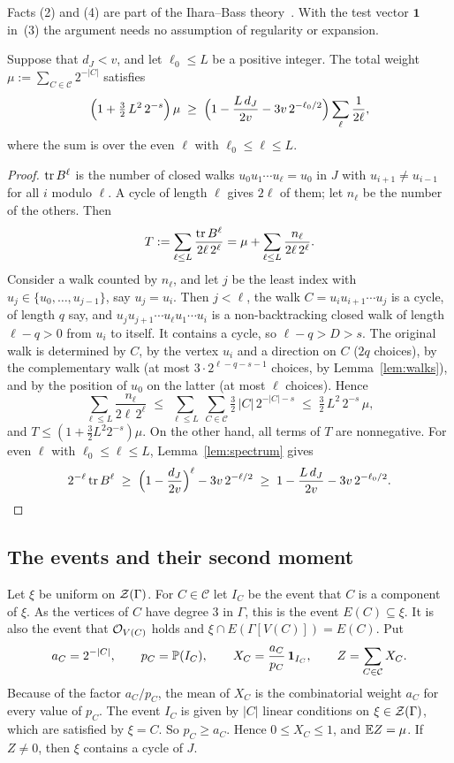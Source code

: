 \documentclass[11pt]{article}
\begin{document}
Facts (2) and (4) are part of the Ihara--Bass theory~\cite{Bass,KS}. With the test vector
$\mathbf{1}$ in~(3) the argument needs no assumption of regularity or expansion.

\begin{lemma}\label{lem:weight}
Suppose that $d_J<v$, and let $\ell_0\le L$ be a positive integer. The total weight
$\mu:=\sum_{C\in\mathcal{C}}2^{-|C|}$ satisfies
\[
  \Bigl(1+\tfrac32\,L^{2}\,2^{-s}\Bigr)\,\mu\;\ge\;
  \Bigl(1-\frac{L\,d_J}{2v}-3v\,2^{-\ell_0/2}\Bigr)\sum_{\ell}\frac1{2\ell},
\]
where the sum is over the even $\ell$ with $\ell_0\le\ell\le L$.
\end{lemma}

\begin{proof}
$\operatorname{tr} B^{\ell}$ is the number of closed walks $u_0u_1\cdots u_\ell=u_0$ in $J$ with
$u_{i+1}\ne u_{i-1}$ for all $i$ modulo $\ell$. A cycle of length $\ell$ gives $2\ell$ of them; let
$n_\ell$ be the number of the others. Then
\[
  T:=\sum_{\ell\le L}\frac{\operatorname{tr} B^{\ell}}{2\ell\,2^{\ell}}=\mu+\sum_{\ell\le L}\frac{n_\ell}{2\ell\,2^{\ell}} .
\]
Consider a walk counted by $n_\ell$, and let $j$ be the least index with
$u_j\in\{u_0,\dots,u_{j-1}\}$, say $u_j=u_i$. Then $j<\ell$, the walk $C=u_iu_{i+1}\cdots u_j$ is a
cycle, of length $q$ say, and $u_ju_{j+1}\cdots u_\ell u_1\cdots u_i$ is a non-backtracking closed
walk of length $\ell-q>0$ from $u_i$ to itself. It contains a cycle, so $\ell-q>D>s$. The original
walk is determined by $C$, by the vertex $u_i$ and a direction on $C$ ($2q$ choices), by the
complementary walk (at most $3\cdot2^{\ell-q-s-1}$ choices, by Lemma~\ref{lem:walks}), and by the
position of $u_0$ on the latter (at most $\ell$ choices). Hence
\[
  \sum_{\ell\le L}\frac{n_\ell}{2\ell\,2^{\ell}}
  \;\le\;\sum_{\ell\le L}\ \sum_{C\in\mathcal{C}}\tfrac32\,|C|\,2^{-|C|-s}
  \;\le\;\tfrac32\,L^{2}\,2^{-s}\,\mu ,
\]
and $T\le(1+\frac32L^{2}2^{-s})\mu$. On the other hand, all terms of $T$ are nonnegative. For even
$\ell$ with $\ell_0\le\ell\le L$, Lemma~\ref{lem:spectrum} gives
\[
  2^{-\ell}\operatorname{tr} B^{\ell}\;\ge\;\Bigl(1-\frac{d_J}{2v}\Bigr)^{\ell}-3v\,2^{-\ell/2}
  \;\ge\;1-\frac{L\,d_J}{2v}-3v\,2^{-\ell_0/2}.\qedhere
\]
\end{proof}

\subsection{The events and their second moment}\label{sec:events}

Let $\xi$ be uniform on $\mathcal{Z}(\Gamma)$. For $C\in\mathcal{C}$ let $I_C$ be the event that $C$ is a
component of $\xi$. As the vertices of $C$ have degree $3$ in $\Gamma$, this is the event
$E(C)\subseteq\xi$. It is also the event that $\mathcal{O}_{V(C)}$ holds and
$\xi\cap E(\Gamma[V(C)])=E(C)$. Put
\[
  a_C=2^{-|C|},\qquad p_C=\mathbb{P}(I_C),\qquad X_C=\frac{a_C}{p_C}\,\mathbf{1}_{I_C},\qquad
  Z=\sum_{C\in\mathcal{C}}X_C .
\]
Because of the factor $a_C/p_C$, the mean of $X_C$ is the combinatorial weight $a_C$ for every
value of $p_C$. The event $I_C$ is given by $|C|$ linear conditions on $\xi\in\mathcal{Z}(\Gamma)$,
which are satisfied by $\xi=C$. So $p_C\ge a_C$. Hence $0\le X_C\le1$, and $\mathbb{E} Z=\mu$. If
$Z\ne0$, then $\xi$ contains a cycle of $J$.
\end{document}
